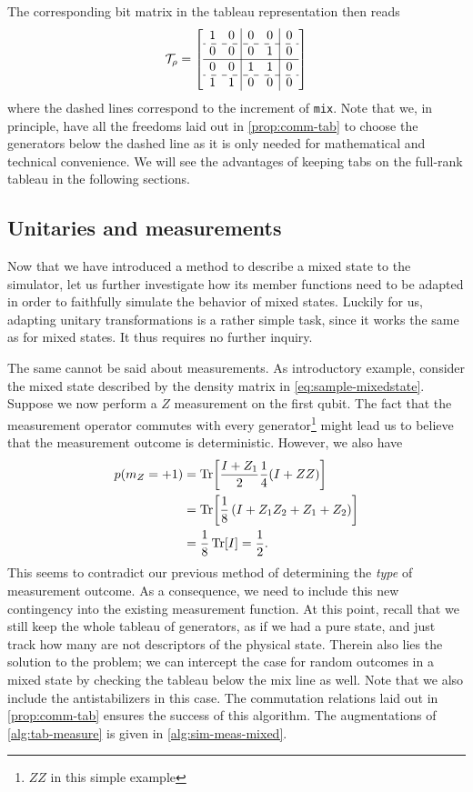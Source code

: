 The corresponding bit matrix in the tableau representation then reads
\begin{align}
\mathcal{T}_{\rho} = 
  \left[
    \begin{array}{cc|cc|c}
      1 & 0 & 0 & 0 & 0 \\ \hdashline
      0 & 0 & 0 & 1 & 0 \\ \hline
      0 & 0 & 1 & 1 & 0 \\ \hdashline
      1 & 1 & 0 & 0 & 0 \\ 
    \end{array}
  \right]
\end{align}
where the dashed lines correspond to the increment of \verb|mix|. Note that we,
in principle, have all the freedoms laid out in \cref{prop:comm-tab} to choose
the generators below the dashed line as it is only needed for mathematical and
technical convenience. We will see the advantages of keeping tabs on the
full-rank tableau in the following sections.
\subsection{Unitaries and measurements}
Now that we have introduced a method to describe a mixed state to the
simulator, let us further investigate how its member functions need to be
adapted in order to faithfully simulate the behavior of mixed states. Luckily
for us, adapting unitary transformations is a rather simple task, since it
works the same as for mixed states. It thus requires no further inquiry. 

The same cannot be said about measurements. As introductory example, consider
the mixed state described by the density matrix in \cref{eq:sample-mixedstate}.
Suppose we now perform a $Z$ measurement on the first qubit. The fact that the
measurement operator commutes with every generator\footnote{$ZZ$ in this simple
example} might lead us to believe that the measurement outcome is
deterministic. However, we also have
\begin{align}
  p(m_Z = +1) &= \Tr[\frac{I+Z_1}{2} \frac{1}{4} (I+ZZ)] \nonumber \\
              &= \Tr[\frac{1}{8}\left(I + Z_1Z_2 + Z_1 + Z_2  \right)] \nonumber \\
              &= \frac{1}{8} \Tr[I] = \frac{1}{2}
.\end{align}
This seems to contradict our previous method of determining the \emph{type} of
measurement outcome. As a consequence, we need to include this new contingency
into the existing measurement function. At this point, recall that we still
keep the whole tableau of generators, as if we had a pure state, and just track
how many are not descriptors of the physical state. Therein also lies the
solution to the problem; we can intercept the case for random outcomes in a
mixed state by checking the tableau below the mix line as well. Note that we
also include the antistabilizers in this case. The commutation relations laid
out in \cref{prop:comm-tab} ensures the success of this algorithm. The
augmentations of \cref{alg:tab-measure} is given in \cref{alg:sim-meas-mixed}.

